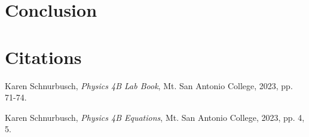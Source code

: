 \documentclass[12pt]{iopart} %
\begin{document}
\section{Conclusion}

\section{Citations}

\begin{thebibliography}{9}

  Karen Schnurbusch,
  \textit{Physics 4B Lab Book},
  Mt. San Antonio College,
  2023,
  pp. 71-74.

  Karen Schnurbusch,
  \textit{Physics 4B Equations},
  Mt. San Antonio College,
  2023,
  pp. 4, 5.

\end{thebibliography}
\end{document}
